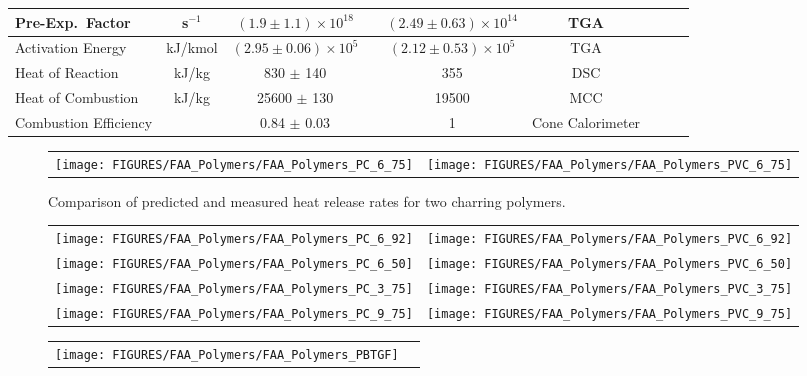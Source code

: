 \begin{table}[h!]
\begin{tabular}{|l|c|c|c|c|c|c|l|l|}
Pre-Exp.~Factor             & s$^{-1}$      & $(1.9 \pm 1.1) \times 10^{18}$    &              &$(2.49 \pm 0.63) \times 10^{14}$         & TGA                   &  \cite{Stoliarov:CF2010}  \\ \hline
Activation Energy           & kJ/kmol       & $(2.95 \pm 0.06) \times 10^{5}$   &            &$(2.12 \pm 0.53) \times 10^{5}$           & TGA                   &  \cite{Stoliarov:CF2010}  \\ \hline
Heat of Reaction            & kJ/kg         & 830 $\pm$ 140                     &                &355       & DSC                   &  \cite{Stoliarov:PDS2008}  \\ \hline
Heat of Combustion          & kJ/kg         & 25600 $\pm$ 130                   &         &19500              & MCC                   &  \cite{Stoliarov:CF2010}  \\ \hline
Combustion Efficiency       &               & 0.84 $\pm$ 0.03                   &              &1         & Cone Calorimeter      &  \cite{Stoliarov:CF2010}  \\ \hline
\end{tabular}
\label{FAA_Properties_Charring}
\end{table}

\begin{figure}[h!]
\begin{tabular*}{\textwidth}{l@{\extracolsep{\fill}}r}
\texttt{[image: FIGURES/FAA\_Polymers/FAA\_Polymers\_PC\_6\_75]} &
\texttt{[image: FIGURES/FAA\_Polymers/FAA\_Polymers\_PVC\_6\_75]}
\end{tabular*}
\caption[Results of FAA Polymers, charring, comparison]{Comparison of predicted and measured heat release rates for two charring polymers.}
\label{FAA_Polymers_Charring}
\end{figure}

\begin{figure}[p]
\begin{tabular*}{\textwidth}{l@{\extracolsep{\fill}}r}
\texttt{[image: FIGURES/FAA\_Polymers/FAA\_Polymers\_PC\_6\_92]} &
\texttt{[image: FIGURES/FAA\_Polymers/FAA\_Polymers\_PVC\_6\_92]}  \\
\texttt{[image: FIGURES/FAA\_Polymers/FAA\_Polymers\_PC\_6\_50]} &
\texttt{[image: FIGURES/FAA\_Polymers/FAA\_Polymers\_PVC\_6\_50]} \\
\texttt{[image: FIGURES/FAA\_Polymers/FAA\_Polymers\_PC\_3\_75]} &
\texttt{[image: FIGURES/FAA\_Polymers/FAA\_Polymers\_PVC\_3\_75]} \\
\texttt{[image: FIGURES/FAA\_Polymers/FAA\_Polymers\_PC\_9\_75]} &
\texttt{[image: FIGURES/FAA\_Polymers/FAA\_Polymers\_PVC\_9\_75]} \\
\end{tabular*}
\end{figure}

\begin{figure}[p]
\begin{tabular*}{\textwidth}{l@{\extracolsep{\fill}}r}
\texttt{[image: FIGURES/FAA\_Polymers/FAA\_Polymers\_PBTGF]} 
\end{tabular*}
\end{figure}
